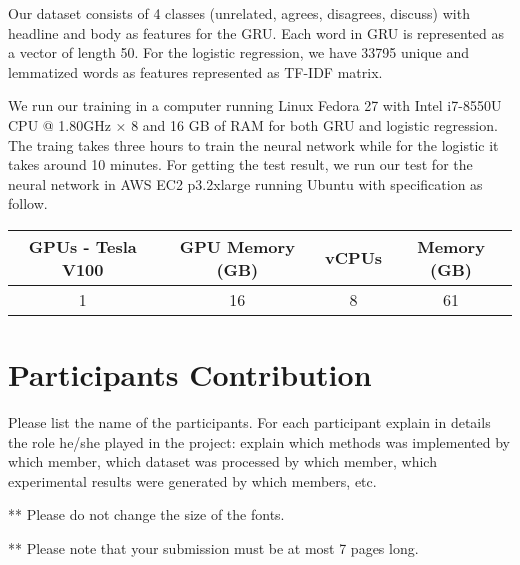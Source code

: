 \documentclass[11.5pt]{article}
\begin{document}
Our dataset consists of 4 classes (unrelated, agrees, disagrees, discuss) with headline and body as features for the GRU. Each word in GRU is represented as a vector of length 50.
For the logistic regression, we have 33795 unique and lemmatized words as features represented as TF-IDF matrix.

We run our training in a computer running Linux Fedora 27 with Intel i7-8550U CPU @ 1.80GHz × 8 and 16 GB of RAM for both GRU and logistic regression. The traing takes three hours to train the neural network while for the logistic it takes around 10 minutes. 
For getting the test result, we run our test for the neural network in AWS EC2 p3.2xlarge running Ubuntu with specification as follow.

\begin{center}
  \begin{tabular} 
    {|c|c|c|c|}
    \hline
    GPUs - Tesla V100 & GPU Memory (GB) & vCPUs & Memory (GB) \\
    \hline
    1 & 16 & 8 & 61 \\
    \hline
  \end{tabular}
\end{center}


\section{Participants Contribution}
Please list the name of the participants. For each participant explain in details the role he/she played in the project: explain which methods was implemented by which member, which dataset was processed by which member, which experimental results were generated by which members, etc.

\vspace{10mm}
** Please do not change the size of the fonts.

** Please note that your submission must be at most 7 pages long.



\end{document}
